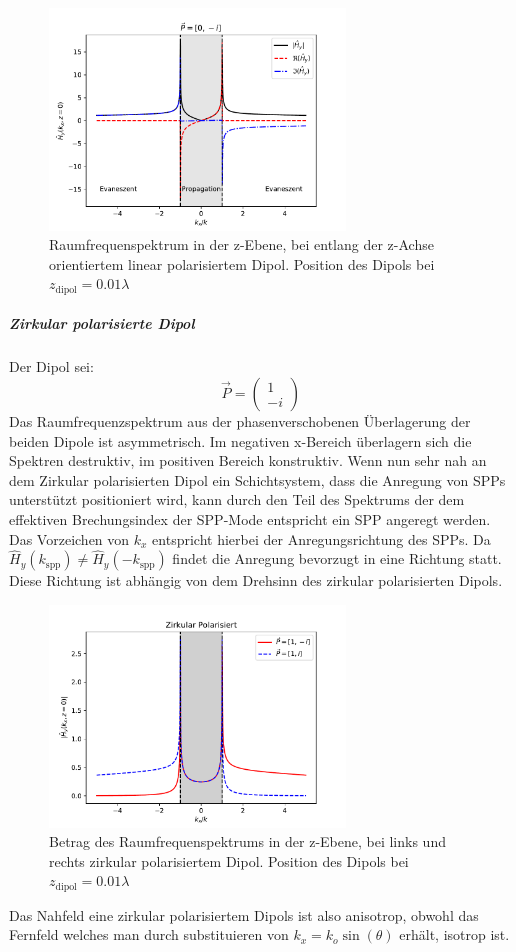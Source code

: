 \documentclass{article}
\begin{document}
		\begin{figure}[h] 
			\centering
			\includegraphics[width=0.7\textwidth]{figures/spatial_spectrum_z.pdf}
			\caption{Raumfrequenspektrum in der z-Ebene, bei entlang der z-Achse orientiertem linear polarisiertem Dipol. Position des Dipols bei $z_{\mathrm{dipol}} = 0.01 \lambda$}
			\label{fig:spatial_spectrum_z}
		\end{figure}
		\subparagraph{Zirkular polarisierte Dipol}
			Der Dipol sei:
			$$\vec{P} = \begin{pmatrix} 1 \\ -i\end{pmatrix}$$
			Das Raumfrequenzspektrum aus der phasenverschobenen Überlagerung der beiden Dipole ist asymmetrisch. Im negativen x-Bereich überlagern sich die Spektren destruktiv, im positiven Bereich konstruktiv. Wenn nun sehr nah an dem Zirkular polarisierten Dipol ein Schichtsystem, dass die Anregung von SPPs unterstützt positioniert wird, kann durch den Teil des Spektrums der dem effektiven Brechungsindex der SPP-Mode entspricht ein SPP angeregt werden. Das Vorzeichen von $k_x$ entspricht hierbei der Anregungsrichtung des SPPs. Da $\hat{H}_y(k_{\mathrm{spp}}) \neq \hat{H}_y( -k_{\mathrm{spp}}) $ findet die Anregung bevorzugt in eine Richtung statt. Diese Richtung ist abhängig von dem Drehsinn des zirkular polarisierten Dipols.
			\begin{figure}[h] 
				\centering
				\includegraphics[width=0.7\textwidth]{figures/spatial_spectrum_circ.pdf}
				\caption{Betrag des Raumfrequenspektrums in der z-Ebene, bei links und rechts zirkular polarisiertem Dipol. Position des Dipols bei $z_{\mathrm{dipol}} = 0.01 \lambda$}
				\label{fig:spatial_spectrum_circ}
			\end{figure}
		Das Nahfeld eine zirkular polarisiertem Dipols ist also anisotrop, obwohl das Fernfeld welches man durch substituieren von $k_x = k_o \sin(\theta)$ erhält, isotrop ist.
	
\end{document}
